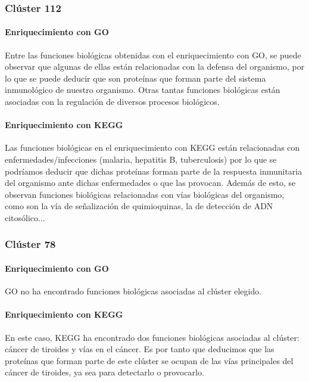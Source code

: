 \subsubsection{Clúster 112}

\paragraph{Enriquecimiento con GO}

Entre las funciones biológicas obtenidas con el enriquecimiento con GO, se puede observar que algunas de ellas están relacionadas con la defensa del organismo, por lo que se puede deducir que son proteínas que forman parte del sistema inmunológico de nuestro organismo. Otras tantas funciones biológicas están asociadas con la regulación de diversos procesos biológicos.

\paragraph{Enriquecimiento con KEGG}

Las funciones biológicas en el enriquecimiento con KEGG están relacionadas con enfermedades/infecciones (malaria, hepatitis B, tuberculosis) por lo que se podríamos deducir que dichas proteínas forman parte de la respuesta inmunitaria del organismo ante dichas enfermedades o que las provocan.
Además de esto, se observan funciones biológicas relacionadas con vías biológicas del organismo, como son la vía de señalización de quimioquinas, la de detección de ADN citosólico...

\subsubsection{Clúster 78}

\paragraph{Enriquecimiento con GO}

GO no ha encontrado funciones biológicas asociadas al clúster elegido.

\paragraph{Enriquecimiento con KEGG}

En este caso, KEGG ha encontrado dos funciones biológicas asociadas al clúster: cáncer de tiroides y vías en el cáncer. Es por tanto que deducimos que las proteínas que forman parte de este clúster se ocupan de las vías principales del cáncer de tiroides, ya sea para detectarlo o provocarlo. 

